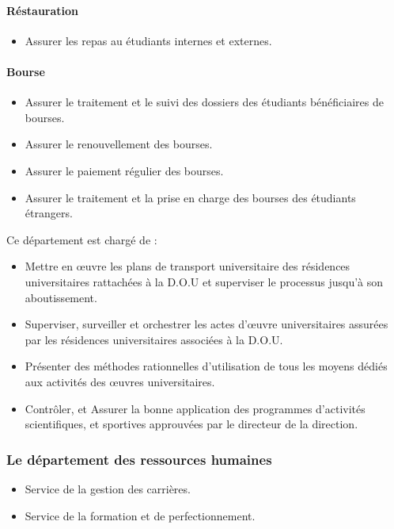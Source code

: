 \paragraph{Réstauration}
\begin{itemize}
    \item Assurer les repas au étudiants internes et externes.
\end{itemize}

\paragraph{Bourse}
\begin{itemize}
    \item Assurer le traitement et le suivi des dossiers des étudiants bénéficiaires de bourses.
    \item Assurer le renouvellement des bourses.
    \item Assurer le paiement régulier des bourses.
    \item Assurer le traitement et la prise en charge des bourses des étudiants étrangers.\\
\end{itemize}

Ce département est chargé de :
\begin{itemize}\renewcommand{\labelitemi}{$\bullet$}
    \item Mettre en œuvre les plans de transport universitaire des résidences universitaires rattachées à la \acs{D.O.U} et superviser le processus jusqu'à son aboutissement.
    \item Superviser, surveiller et orchestrer les actes d'œuvre universitaires assurées par les résidences universitaires associées à la \acs{D.O.U}.
    \item Présenter des méthodes rationnelles d'utilisation de tous les moyens dédiés aux activités des œuvres universitaires.
    \item Contrôler, et Assurer la bonne application des programmes d'activités scientifiques, et sportives approuvées par le directeur de la direction.\\
\end{itemize}

\subsubsection{Le département des ressources humaines}
\begin{itemize}
    \item Service de la gestion des carrières.
    \item Service de la formation et de perfectionnement.\\
\end{itemize}

